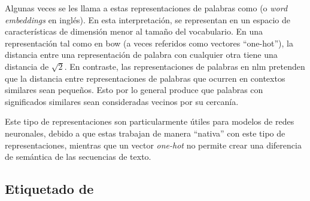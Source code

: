 Algunas veces se les llama a estas representaciones de palabras como  (o \textsl{word embeddings} en inglés). En esta interpretación, se representan en un espacio de características de dimensión menor al tamaño del vocabulario. En una representación tal como en \gls{bow} (a veces referidos como vectores ``one-hot''), la distancia entre una representación de palabra con cualquier otra tiene una distancia de $\sqrt{2}$. En contraste, las representaciones de palabras en \gls{nlm} pretenden que la distancia entre representaciones de palabras que ocurren en contextos similares sean pequeños. Esto por lo general produce que palabras con significados similares sean consideradas vecinos por su cercanía.

Este tipo de representaciones son particularmente útiles para modelos de redes neuronales, debido a que estas trabajan de manera ``nativa'' con este tipo de representaciones, mientras que un vector \emph{one-hot} no permite crear una diferencia de semántica de las secuencias de texto.

\subsection{Etiquetado de }

\subsection{}
